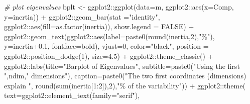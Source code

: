 \documentclass[
]{article}
\newenvironment{Shaded}{\begin{snugshade}}{\end{snugshade}}
\newcommand{\AttributeTok}[1]{\textcolor[rgb]{0.77,0.63,0.00}{#1}}
\newcommand{\CommentTok}[1]{\textcolor[rgb]{0.56,0.35,0.01}{\textit{#1}}}
\newcommand{\ConstantTok}[1]{\textcolor[rgb]{0.00,0.00,0.00}{#1}}
\newcommand{\DecValTok}[1]{\textcolor[rgb]{0.00,0.00,0.81}{#1}}
\newcommand{\FloatTok}[1]{\textcolor[rgb]{0.00,0.00,0.81}{#1}}
\newcommand{\FunctionTok}[1]{\textcolor[rgb]{0.00,0.00,0.00}{#1}}
\newcommand{\NormalTok}[1]{#1}
\newcommand{\OtherTok}[1]{\textcolor[rgb]{0.56,0.35,0.01}{#1}}
\newcommand{\SpecialCharTok}[1]{\textcolor[rgb]{0.00,0.00,0.00}{#1}}
\newcommand{\StringTok}[1]{\textcolor[rgb]{0.31,0.60,0.02}{#1}}
\begin{document}
\begin{Shaded}
\begin{Highlighting}[]
\CommentTok{\# plot eigenvalues}
\NormalTok{bplt }\OtherTok{\textless{}{-}}\NormalTok{ ggplot2}\SpecialCharTok{::}\FunctionTok{ggplot}\NormalTok{(}\AttributeTok{data=}\NormalTok{m, ggplot2}\SpecialCharTok{::}\FunctionTok{aes}\NormalTok{(}\AttributeTok{x=}\NormalTok{Comp, }\AttributeTok{y=}\NormalTok{inertia)) }\SpecialCharTok{+}
\NormalTok{  ggplot2}\SpecialCharTok{::}\FunctionTok{geom\_bar}\NormalTok{(}\AttributeTok{stat =}\StringTok{"identity"}\NormalTok{, ggplot2}\SpecialCharTok{::}\FunctionTok{aes}\NormalTok{(}\AttributeTok{fill=}\FunctionTok{as.factor}\NormalTok{(inertia)),}
                    \AttributeTok{show.legend =} \ConstantTok{FALSE}\NormalTok{) }\SpecialCharTok{+}
\NormalTok{  ggplot2}\SpecialCharTok{::}\FunctionTok{geom\_text}\NormalTok{(ggplot2}\SpecialCharTok{::}\FunctionTok{aes}\NormalTok{(}\AttributeTok{label=}\FunctionTok{paste0}\NormalTok{(}\FunctionTok{round}\NormalTok{(inertia,}\DecValTok{2}\NormalTok{),}\StringTok{"\%"}\NormalTok{),}
                                  \AttributeTok{y=}\NormalTok{inertia}\FloatTok{+0.1}\NormalTok{, }\AttributeTok{fontface=}\StringTok{\textquotesingle{}bold\textquotesingle{}}\NormalTok{),}
                                  \AttributeTok{vjust=}\DecValTok{0}\NormalTok{,}
                                  \AttributeTok{color=}\StringTok{"black"}\NormalTok{,}
                                  \AttributeTok{position =}\NormalTok{ ggplot2}\SpecialCharTok{::}\FunctionTok{position\_dodge}\NormalTok{(}\DecValTok{1}\NormalTok{), }\AttributeTok{size=}\FloatTok{4.5}\NormalTok{) }\SpecialCharTok{+}
\NormalTok{  ggplot2}\SpecialCharTok{::}\FunctionTok{theme\_classic}\NormalTok{() }\SpecialCharTok{+}
\NormalTok{  ggplot2}\SpecialCharTok{::}\FunctionTok{labs}\NormalTok{(}\AttributeTok{title=}\StringTok{"Barplot of Eigenvalues"}\NormalTok{,}
                \AttributeTok{subtitle=}\FunctionTok{paste0}\NormalTok{(}\StringTok{"Using the first "}\NormalTok{,ndim,}\StringTok{" dimensions"}\NormalTok{),}
                \AttributeTok{caption=}\FunctionTok{paste0}\NormalTok{(}\StringTok{"The two first coordinates (dimensions) explain "}\NormalTok{,}
                               \FunctionTok{round}\NormalTok{(}\FunctionTok{sum}\NormalTok{(inertia[}\DecValTok{1}\SpecialCharTok{:}\DecValTok{2}\NormalTok{]),}\DecValTok{2}\NormalTok{),}\StringTok{"\% of the variability"}\NormalTok{)) }\SpecialCharTok{+}
\NormalTok{  ggplot2}\SpecialCharTok{::}\FunctionTok{theme}\NormalTok{(}
    \AttributeTok{text=}\NormalTok{ggplot2}\SpecialCharTok{::}\FunctionTok{element\_text}\NormalTok{(}\AttributeTok{family=}\StringTok{"serif"}\NormalTok{),}

\end{Highlighting}
\end{Shaded}
\end{document}
